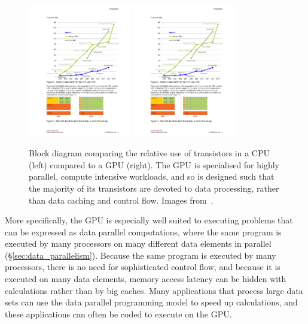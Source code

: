 \begin{figure}[tbp]
    \centering
    \includegraphics[width=0.4\textwidth]{images/basics/block_cpu}
    \includegraphics[width=0.4\textwidth]{images/basics/block_gpu}
    \caption[Block diagram comparing CPU and GPU architectures]{Block diagram
    comparing the relative use of transistors in a CPU (left) compared to a GPU
    (right). The GPU is specialised for highly parallel, compute intensive
    workloads, and so is designed such that the majority of its transistors are
    devoted to data processing, rather than data caching and control flow.
    Images from~\cite{NVIDIA:2012wf}.}
    \label{fig:cpu_gpu_block_diagram}
\end{figure}

More specifically, the GPU\gpu{} is especially well suited to executing
problems that can be expressed as data parallel computations, where the same
program is executed by many processors on many different data elements in
parallel (\S\ref{sec:data_parallelism}). Because the same program is executed by
many processors, there is no need for sophisticated control flow, and because it
is executed on many data elements, memory access latency can be hidden with
calculations rather than by big caches. Many applications that process large
data sets can use the data parallel programming model to speed up calculations,
and these applications can often be coded to execute on the GPU\@.


